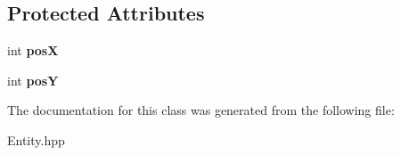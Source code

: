 \subsection*{Protected Attributes}
\begin{DoxyCompactItemize}
\item 
\mbox{\label{class_entity_aed19b548bf7e959c6e6443bd86e95663}} 
int {\bfseries posX}
\item 
\mbox{\label{class_entity_a68f5b79639fd7aca3a17cacf16dcf028}} 
int {\bfseries posY}
\end{DoxyCompactItemize}


The documentation for this class was generated from the following file\+:\begin{DoxyCompactItemize}
\item 
Entity.\+hpp\end{DoxyCompactItemize}
